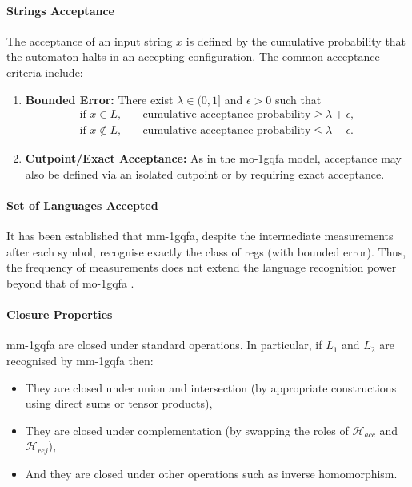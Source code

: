 \paragraph{Strings Acceptance}  
The acceptance of an input string $x$ is defined by the cumulative probability that the automaton halts in an accepting configuration. The common acceptance criteria include:
\begin{enumerate}
  \item \textbf{Bounded Error:} There exist $\lambda\in(0,1]$ and $\epsilon>0$ such that
  \[
  \begin{aligned}
  \text{if } x\in L,&\quad \text{cumulative acceptance probability} \ge \lambda+\epsilon,\\[1mm]
  \text{if } x\notin L,&\quad \text{cumulative acceptance probability} \le \lambda-\epsilon.
  \end{aligned}
  \]
  \item \textbf{Cutpoint/Exact Acceptance:} As in the \gls{mo-1gqfa} model, acceptance may also be defined via an isolated cutpoint or by requiring exact acceptance.
\end{enumerate}

\paragraph{Set of Languages Accepted} 
It has been established that \gls{mm-1gqfa}, despite the intermediate measurements after each symbol, recognise exactly the class of \glspl{reg} (with bounded error). Thus, the frequency of measurements does not extend the language recognition power beyond that of \gls{mo-1gqfa} \cite{li2012characterizations}.

\paragraph{Closure Properties}  
\gls{mm-1gqfa} are closed under standard operations. In particular, if $L_1$ and $L_2$ are recognised by \gls{mm-1gqfa} then:
\begin{itemize}
  \item They are closed under union and intersection (by appropriate constructions using direct sums or tensor products),
  \item They are closed under complementation (by swapping the roles of $\mathcal{H}_{acc}$ and $\mathcal{H}_{rej}$),
  \item And they are closed under other operations such as inverse homomorphism.
\end{itemize}

